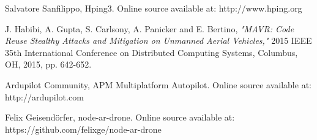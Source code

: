 \documentclass[journal]{IEEEtran}
\begin{document}
\begin{thebibliography}{1}
Salvatore Sanfilippo, Hping3. Online source available at: http://www.hping.org

J. Habibi, A. Gupta, S. Carlsony, A. Panicker and E. Bertino, \textit{"MAVR: Code Reuse Stealthy Attacks and Mitigation on Unmanned Aerial Vehicles,"} 2015 IEEE 35th International Conference on Distributed Computing Systems, Columbus, OH, 2015, pp. 642-652.

Ardupilot Community, APM Multiplatform Autopilot. Online source available at: http://ardupilot.com

Felix Geisendörfer, node-ar-drone. Online source available at: https://github.com/felixge/node-ar-drone


\end{thebibliography}
\end{document}
